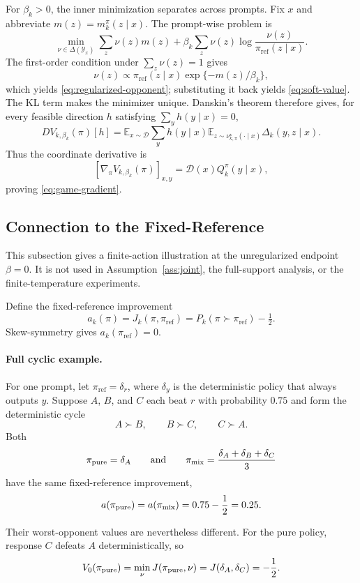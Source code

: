 \documentclass{article}
\theoremstyle{remark}
\theoremstyle{plain}
\newcommand{\Y}{\mathcal{Y}}
\newcommand{\E}{\mathbb{E}}
\newcommand{\D}{\mathcal{D}}
\newcommand{\piref}{\pi_{\mathrm{ref}}}
\begin{document}
For $\beta_k>0$, the inner minimization separates across prompts. Fix $x$ and abbreviate $m(z)=m_k^\pi(z\mid x)$. The prompt-wise problem is
\[
\min_{\nu\in\Delta(\Y_x)}
\sum_z\nu(z)m(z)
+
\beta_k\sum_z\nu(z)
\log\frac{\nu(z)}{\piref(z\mid x)}.
\]
The first-order condition under $\sum_z\nu(z)=1$ gives
\[
\nu(z)\propto\piref(z\mid x)\exp\{-m(z)/\beta_k\},
\]
which yields \eqref{eq:regularized-opponent}; substituting it back yields \eqref{eq:soft-value}. The KL term makes the minimizer unique. Danskin's theorem therefore gives, for every feasible direction $h$ satisfying $\sum_yh(y\mid x)=0$,
\[
D V_{k,\beta_k}(\pi)[h]
=
\E_{x\sim\D}\sum_y h(y\mid x)
\E_{z\sim\nu^\star_{k,\pi}(\cdot\mid x)}
\Delta_k(y,z\mid x).
\]
Thus the coordinate derivative is
\[
\left[\nabla_\pi V_{k,\beta_k}(\pi)\right]_{x,y}
=
\D(x)Q_k^\pi(y\mid x),
\]
proving \eqref{eq:game-gradient}.

\subsection{Connection to the Fixed-Reference}
\label{app:anchor-limit}
This subsection gives a finite-action illustration at the unregularized endpoint $\beta=0$. It is not used in Assumption~\ref{ass:joint}, the full-support analysis, or the finite-temperature experiments.

Define the fixed-reference improvement
\begin{equation}
a_k(\pi)=J_k(\pi,\piref)=P_k(\pi\succ\piref)-\tfrac12.
\label{eq:anchor-margin}
\end{equation}
Skew-symmetry gives $a_k(\piref)=0$.

\paragraph{Full cyclic example.}
For one prompt, let $\piref=\delta_r$, where $\delta_y$ is the deterministic
policy that always outputs $y$. Suppose $A$, $B$, and $C$ each beat $r$
with probability $0.75$ and form the deterministic cycle
\[
A\succ B,\qquad B\succ C,\qquad C\succ A.
\]
Both
\[
\pi_{\rm pure}=\delta_A
\qquad\text{and}\qquad
\pi_{\rm mix}=\frac{\delta_A+\delta_B+\delta_C}{3}
\]
have the same fixed-reference improvement,
\[
a(\pi_{\rm pure})
=
a(\pi_{\rm mix})
=
0.75-\frac12
=
0.25.
\]

Their worst-opponent values are nevertheless different. For the pure
policy, response $C$ defeats $A$ deterministically, so
\[
V_0(\pi_{\rm pure})
=
\min_{\nu} J(\pi_{\rm pure},\nu)
=
J(\delta_A,\delta_C)
=
-\frac12.
\]
\end{document}
